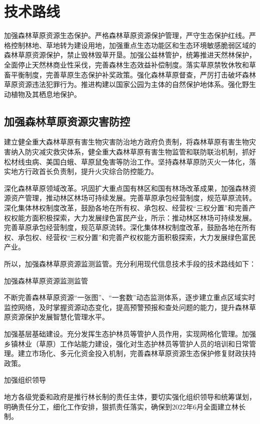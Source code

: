\section{技术路线}

加强森林草原资源生态保护。严格森林草原资源保护管理，严守生态保护红线。严格控制林地、草地转为建设用地，加强重点生态功能区和生态环境敏感脆弱区域的森林草原资源保护，禁止毁林毁草开垦。加强公益林管护，统筹推进天然林保护，全面停止天然林商业性采伐，完善森林生态效益补偿制度。落实草原禁牧休牧和草畜平衡制度，完善草原生态保护补奖政策。强化森林草原督查，严厉打击破坏森林草原资源违法犯罪行为。推进构建以国家公园为主体的自然保护地体系。强化野生动植物及其栖息地保护。

\subsection{加强森林草原资源灾害防控}

建立健全重大森林草原有害生物灾害防治地方政府负责制，将森林草原有害生物灾害纳入防灾减灾救灾体系，健全重大森林草原有害生物监管和联防联治机制，抓好松材线虫病、美国白蛾、草原鼠兔害等防治工作。坚持森林草原防灭火一体化，落实地方行政首长负责制，提升火灾综合防控能力。

深化森林草原领域改革。巩固扩大重点国有林区和国有林场改革成果，加强森林资源资产管理，推动林区林场可持续发展。完善草原承包经营制度，规范草原流转。深化集体林权制度改革，鼓励各地在所有权、承包权、经营权“三权分置”和完善产权权能方面积极探索，大力发展绿色富民产业，所示：推动林区林场可持续发展。完善草原承包经营制度，规范草原流转。深化集体林权制度改革，鼓励各地在所有权、承包权、经营权“三权分置”和完善产权权能方面积极探索，大力发展绿色富民产业。


所以，加强森林草原资源监测监管。充分利用现代信息技术手段的技术路线如下：

\subtitle{1）}{加强森林草原资源监测监管}

不断完善森林草原资源“一张图”、“一套数”动态监测体系，逐步建立重点区域实时监控网络，及时掌握资源动态变化，提高预警预报和查处问题的能力，提升森林草原资源保护发展智慧化管理水平。

加强基层基础建设。充分发挥生态护林员等管护人员作用，实现网格化管理。加强乡镇林业（草原）工作站能力建设，强化对生态护林员等管护人员的培训和日常管理。建立市场化、多元化资金投入机制，完善森林草原资源生态保护修复财政扶持政策。

\subtitle{2）}{加强组织领导}

地方各级党委和政府是推行林长制的责任主体，要切实强化组织领导和统筹谋划，明确责任分工，细化工作安排，狠抓责任落实，确保到2022年6月全面建立林长制。

